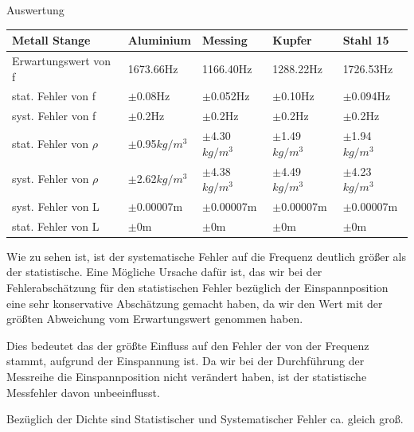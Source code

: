 \documentclass[twoside]{protokoll}
\begin{document}
\begin{aufgabe}{Auswertung}
 \begin{table}[H]
        \centering
        \begin{tabularx}{1\textwidth}{l X X X X} %
            \toprule
            \textbf{Metall Stange} & \textbf{Aluminium} & \textbf{Messing} & \textbf{Kupfer} & \textbf{Stahl 15} \\
            \midrule
            Erwartungswert von f & 1673.66Hz & 1166.40Hz & 1288.22Hz & 1726.53Hz \\
            stat. Fehler von f & $\pm$0.08Hz & $\pm$0.052Hz & $\pm$0.10Hz & $\pm$0.094Hz \\
            syst. Fehler von f & $\pm$0.2Hz & $\pm$0.2Hz & $\pm$0.2Hz & $\pm$0.2Hz \\
            \midrule
            stat. Fehler von $\rho$ & $\pm$0.95$kg/m^3$ & $\pm$4.30$kg/m^3$ & $\pm$1.49$kg/m^3$ & $\pm$1.94$kg/m^3$ \\
            syst. Fehler von $\rho$ & $\pm$2.62$kg/m^3$ & $\pm$4.38$kg/m^3$ & $\pm$4.49$kg/m^3$ & $\pm$4.23$kg/m^3$ \\
            \midrule
            syst. Fehler von L      & $\pm$0.00007m     & $\pm$0.00007m     & $\pm$0.00007m     & $\pm$0.00007m \\
            stat. Fehler von L      & $\pm$0m     & $\pm$0m     & $\pm$0m     & $\pm$0m \\
            \bottomrule
        \end{tabularx}
    \end{table}
Wie zu sehen ist, ist der systematische Fehler auf die Frequenz deutlich größer als der statistische.
Eine Mögliche Ursache dafür ist, das wir bei der Fehlerabschätzung für den statistischen Fehler bezüglich der Einspannposition eine sehr konservative Abschätzung gemacht haben,
da wir den Wert mit der größten Abweichung vom Erwartungswert genommen haben.

Dies bedeutet das der größte Einfluss auf den Fehler der von der Frequenz stammt, aufgrund der Einspannung ist.
Da wir bei der Durchführung der Messreihe die Einspannposition nicht verändert haben, ist der statistische Messfehler davon unbeeinflusst.

Bezüglich der Dichte sind Statistischer und Systematischer Fehler ca. gleich groß. \\
 

\end{aufgabe}
\end{document}
